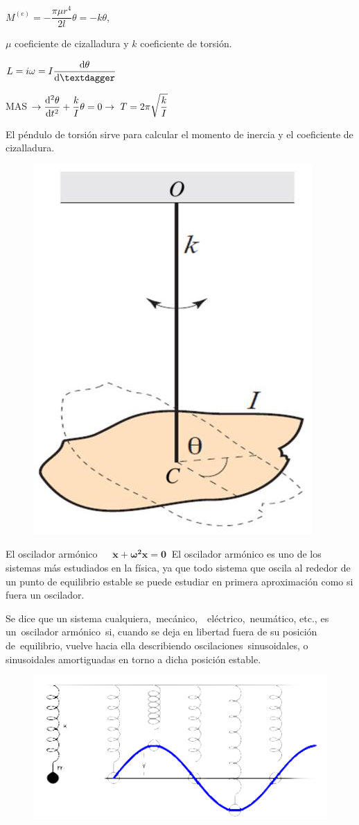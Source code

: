 {\begin{multicols}{2}
$M^{(e)}=-\dfrac{\pi \mu r^4}{2l}\theta=-k\theta$, 

$\mu$ coeficiente de cizalladura y $k$ coeficiente de torsión.

$L=i\omega=I\displaystyle \dv{\theta}{†}$

MAS $ \to \displaystyle \dv[2]{\theta}{t}+ \dfrac k I \theta = 0 \to \ T=2\pi \sqrt{\dfrac k I}$

El péndulo de torsión sirve para calcular el momento de inercia y el coeficiente de cizalladura. 
\begin{figure}[H]
		\centering
		\includegraphics[width=.35\textwidth]{imagenes/imagenes19/T19IM08.png}
	\end{figure}	
\end{multicols}

\newpage %

\begin{myblock}{El oscilador armónico $\quad \boxed{\  \boldsymbol{\ddot x + \omega^2 x=0} \ }$}
El oscilador armónico es uno de los sistemas más estudiados en la física, ya que todo sistema que oscila al rededor de un punto de equilibrio estable se puede estudiar en primera aproximación como si fuera un oscilador.


\vspace{2mm} Se dice que un sistema cualquiera, mecánico,  eléctrico, neumático, etc., es un oscilador armónico si, cuando se deja en libertad fuera de su posición de equilibrio, vuelve hacia ella describiendo oscilaciones sinusoidales, o sinusoidales amortiguadas en torno a dicha posición estable.

\begin{figure}[H]
		\centering
		\includegraphics[width=1\textwidth]{imagenes/imagenes19/T19IM09.png}
	\end{figure}


\end{myblock}}
